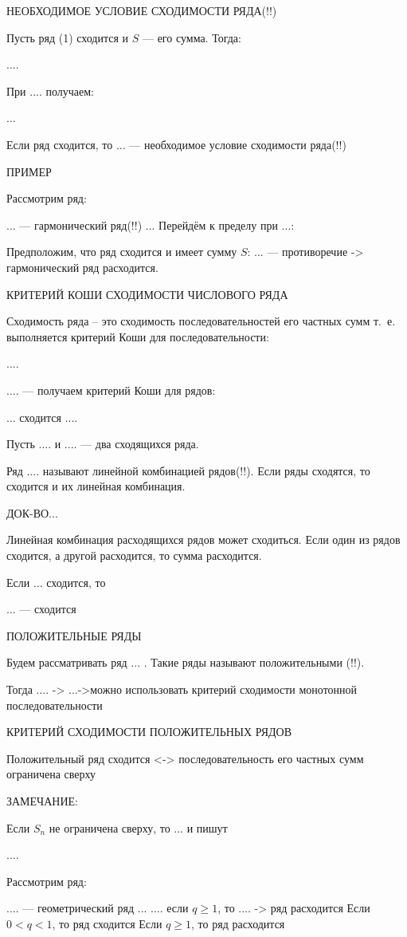\documentclass[../../main.tex]{subfiles}
\begin{document}
НЕОБХОДИМОЕ УСЛОВИЕ СХОДИМОСТИ РЯДА(!!)

Пусть ряд (1) сходится и $S$ --- его сумма. Тогда:

....

При .... получаем:

...

Если ряд сходится, то ... --- необходимое условие сходимости ряда(!!)

ПРИМЕР

Рассмотрим ряд:

... --- гармонический ряд(!!)
...
Перейдём к пределу при ...:

Предположим, что ряд сходится и имеет сумму $S$: 
... --- противоречие -> гармонический ряд расходится.

КРИТЕРИЙ КОШИ СХОДИМОСТИ ЧИСЛОВОГО РЯДА

Сходимость ряда -- это сходимость последовательностей его частных
сумм т.~е. выполняется критерий Коши для последовательности:

....


.... --- получаем критерий Коши для рядов:

... сходится ....

Пусть .... и .... --- два сходящихся ряда.

Ряд .... называют линейной комбинацией рядов(!!). 
Если ряды
сходятся, то сходится и их линейная комбинация.
 
 ДОК-ВО...
 
 Линейная комбинация расходящихся рядов может сходиться.
 Если один из рядов сходится, а другой расходится, то 
 сумма расходится.

Если ... сходится, то

... --- сходится

ПОЛОЖИТЕЛЬНЫЕ РЯДЫ

Будем рассматривать ряд ... . Такие ряды
называют положительными (!!).

Тогда .... -> ...->можно использовать критерий
 сходимости монотонной последовательности
 
 КРИТЕРИЙ СХОДИМОСТИ ПОЛОЖИТЕЛЬНЫХ РЯДОВ
 
 Положительный ряд сходится <-> последовательность 
 его частных сумм ограничена сверху
 
 ЗАМЕЧАНИЕ:
 
 Если  $S_n$ не ограничена сверху, то ... и пишут
 
 ....
 
 Рассмотрим ряд:
 
.... --- геометрический ряд
... .... если $q \geq 1$, то
.... -> ряд расходится
Если $0 < q < 1$, то ряд сходится
Если $q \geq 1$, то ряд  расходится
\end{document}
